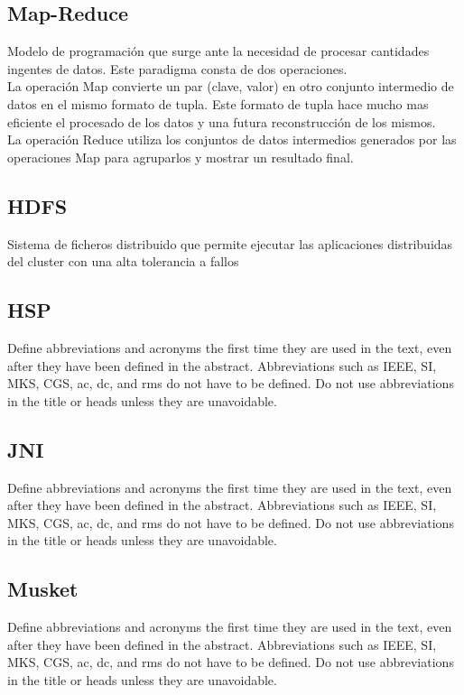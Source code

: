 \documentclass[conference]{IEEEtran}
\begin{document}
\subsection{Map-Reduce}
Modelo de programación que surge ante la necesidad de procesar cantidades ingentes de datos. Este paradigma consta de dos operaciones.\\
La operación Map convierte un par (clave, valor) en otro conjunto intermedio de datos en el mismo formato de tupla. Este formato de tupla hace mucho mas eficiente el procesado de los datos y una futura reconstrucción de los mismos.\\
La operación Reduce utiliza los conjuntos de datos intermedios generados por las operaciones Map para agruparlos y mostrar un resultado final.

\subsection{HDFS}
Sistema de ficheros distribuido que permite ejecutar las aplicaciones distribuidas del cluster con una alta tolerancia a fallos 

\subsection{HSP}
Define abbreviations and acronyms the first time they are used in the text, 
even after they have been defined in the abstract. Abbreviations such as 
IEEE, SI, MKS, CGS, ac, dc, and rms do not have to be defined. Do not use 
abbreviations in the title or heads unless they are unavoidable.

\subsection{JNI}
Define abbreviations and acronyms the first time they are used in the text, 
even after they have been defined in the abstract. Abbreviations such as 
IEEE, SI, MKS, CGS, ac, dc, and rms do not have to be defined. Do not use 
abbreviations in the title or heads unless they are unavoidable.


\subsection{Musket}
Define abbreviations and acronyms the first time they are used in the text, 
even after they have been defined in the abstract. Abbreviations such as 
IEEE, SI, MKS, CGS, ac, dc, and rms do not have to be defined. Do not use 
abbreviations in the title or heads unless they are unavoidable.
\end{document}
